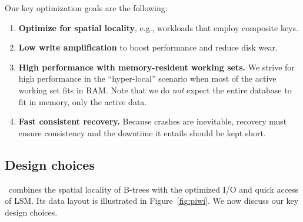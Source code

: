 Our key optimization goals are the following:
\begin{enumerate}
\item {\bf Optimize for spatial locality}, e.g., workloads that employ composite keys.


\item {\bf Low write amplification}  to boost performance 
and reduce disk wear.%
 
\item {\bf High performance  with memory-resident working sets.}
We strive for high performance in the ``hyper-local'' scenario when most of the active working set fits in RAM. 
Note that we do \emph{not} expect the entire database to fit in
memory, only the active data.  
 
\item {\bf Fast consistent recovery.}  Because crashes are inevitable, recovery must ensure consistency and 
the downtime it entails should be kept  short. 
\end{enumerate}

\subsection{Design choices}




\sys\ combines the spatial locality of B-trees with the optimized I/O and quick access of LSM. 
Its data layout is illustrated in Figure~\ref{fig:piwi}.  We now discuss our key design choices.   

